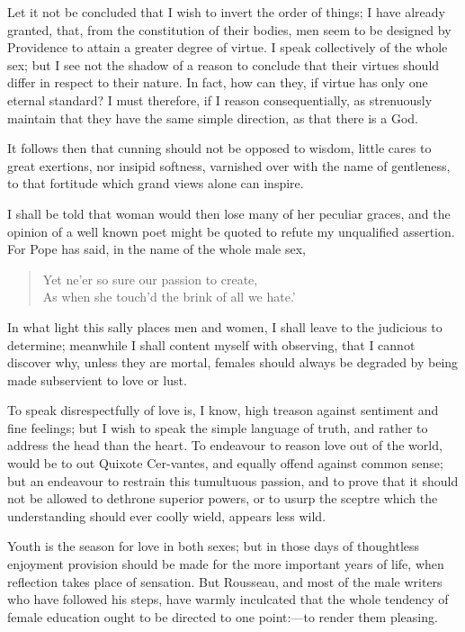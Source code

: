 Let it not be concluded that I wish to invert the order of things; I
have already granted, that, from the constitution of their bodies, men
seem to be designed by Providence to attain a greater degree of
virtue. I speak collectively of the whole sex; but I see not the
shadow of a reason to conclude that their virtues should differ in
respect to their nature. In fact, how can they, if virtue has only one
eternal standard? I must therefore, if I reason consequentially, as
strenuously maintain that they have the same simple direction, as that
there is a God.

It follows then that cunning should not be opposed to wisdom,
little cares to great exertions, nor insipid softness, varnished over
with the name of gentleness, to that fortitude which grand views alone
can inspire.

I shall be told that woman would then lose many of her peculiar
graces, and the opinion of a well known poet might be quoted to refute
my unqualified assertion. For Pope has said, in the name of the whole
male sex,

\begin{verse}
Yet ne'er so sure our passion to create,\\
As when she touch'd the brink of all we hate.'
\end{verse}

In what light this sally places men and women, I shall leave to the
judicious to determine; meanwhile I shall content myself with
observing, that I cannot discover why, unless they are mortal, females
should always be degraded by being made subservient to love or lust.

To speak disrespectfully of love is, I know, high treason against
sentiment and fine feelings; but I wish to speak the simple language
of truth, and rather to address the head than the heart. To endeavour
to reason love out of the world, would be to out Quixote
Cer-vantes, and equally offend against common sense; but an
endeavour to restrain this tumultuous passion, and to prove that it
should not be allowed to dethrone superior powers, or to usurp the
sceptre which the understanding should ever coolly wield, appears less
wild.

Youth is the season for love in both sexes; but in those days of
thoughtless enjoyment provision should be made for the more important
years of life, when reflection takes place of sensation. But Rousseau,
and most of the male writers who have followed his steps, have warmly
inculcated that the whole tendency of female education ought to be
directed to one point:---to render them pleasing.

